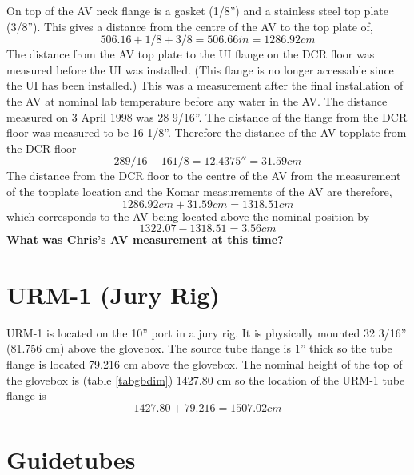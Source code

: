 On top of the AV neck flange is a gasket (1/8'') and a stainless steel
top plate (3/8'').  This gives a distance from the centre of the
AV to the top plate of,
\[
     506.16 + 1/8 + 3/8 = 506.66 in = 1286.92 cm
\]
The distance from the AV top plate to the UI flange on the DCR floor
was measured before the UI was installed.  (This flange is no longer
accessable since the UI has been installed.)  This was a measurement
after the final installation of the AV at nominal lab temperature before
any water in the AV.
The distance measured on 3 April 1998 was
28 9/16''.  The distance of the flange from the DCR floor was measured
to be 16 1/8''.  Therefore the distance of the AV topplate from the
DCR floor
\[
           28 9/16 - 16 1/8 = 12.4375'' = 31.59 cm
\]
The distance from the DCR floor to the centre of the AV from the 
measurement of the topplate location and the Komar measurements of the
AV are therefore,
\[
          1286.92 cm + 31.59 cm  = 1318.51 cm
\]
which corresponds to the AV being located above the nominal position
by 
\[
           1322.07 - 1318.51 = 3.56 cm
\]
{\bf What was Chris's AV measurement at this time?}

\section{URM-1 (Jury Rig)}
URM-1 is located on the 10'' port in a jury rig.  It is physically  mounted
32 3/16'' (81.756 cm) above the glovebox.  The source tube flange is 1''
thick so the tube flange is located 79.216 cm above the glovebox.  The
nominal height of the top of the glovebox is (table \ref{tabgbdim})
1427.80 cm so the location of the URM-1 tube flange is
\[
        1427.80 + 79.216 = 1507.02 cm
\]


  
\section{Guidetubes}

